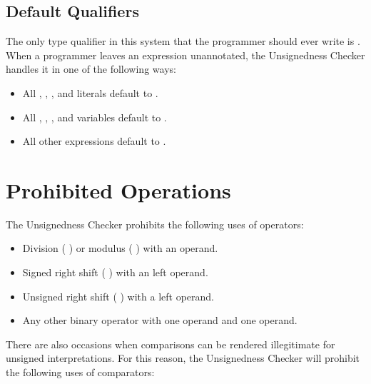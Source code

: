 \subsection{Default Qualifiers\label{unsignedness-checker-annotations-default-qualifiers}}

The only type qualifier in this system that the programmer should ever write is
. When a programmer leaves an expression unannotated, the
Unsignedness Checker handles it in one of the following ways:

\begin{itemize}

    \item
    All , , , and  literals default
    to .
    \item
    All , , , and  variables default
    to .
    \item
    All other expressions default to .

\end{itemize}

\section{Prohibited Operations\label{unsignedness-checker-Prohibited-Operations}}

The Unsignedness Checker prohibits the following uses of operators:

\begin{itemize}

    \item   
    Division ( \code{/} ) or modulus ( \code{\%} ) with an 
    operand.
    \item   
    Signed right shift ( \code{>>} ) with an  left operand.
    \item   
    Unsigned right shift ( \code{>>>} ) with a  left operand.
    \item   
    Any other binary operator with one  operand and one
     operand.

\end{itemize}

There are also occasions when comparisons can be rendered illegitimate for
unsigned interpretations. For this reason, the Unsignedness Checker will prohibit the following uses of comparators:

